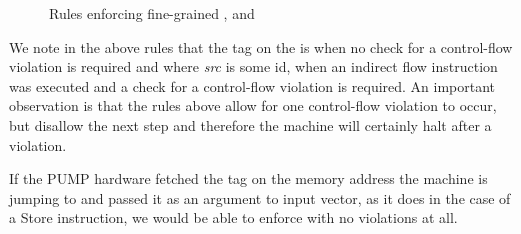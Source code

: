 \begin{figure}[!htpb]
\bigskip

\bigskip

\bigskip

\bigskip

\bigskip

\caption{Rules enforcing fine-grained \CFI, \NXD and \NWC}
\end{figure}

We note in the above rules that the tag on the \PCname is \DATAname when
no check for a control-flow violation is required and  where
\textit{src} is some id, when an indirect flow instruction was executed and a
check for a control-flow violation is required. An important observation is that
the rules above allow for one control-flow violation to occur, but disallow the
next step and therefore the machine will certainly halt after a violation.

If the PUMP hardware fetched the tag on the memory address the machine is
jumping to and passed it as an argument to input vector, as it does in the
case of a Store instruction, we would be able to enforce \CFI with no violations
at all. 






